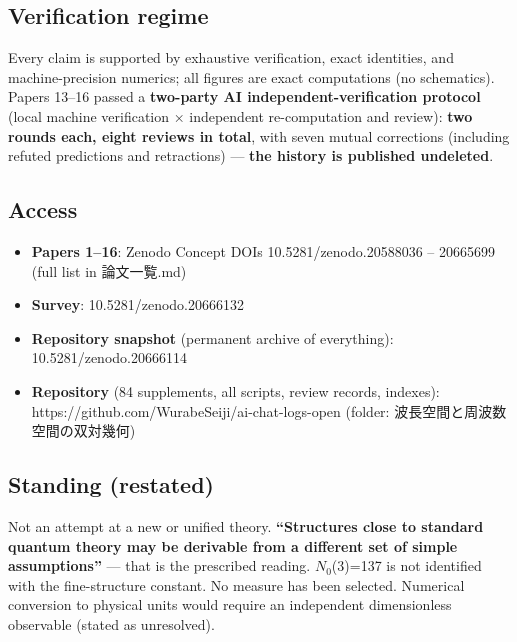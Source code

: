 \documentclass[
  10pt,
]{article}
\providecommand{\tightlist}{%
  \setlength{\itemsep}{0pt}\setlength{\parskip}{0pt}}
\begin{document}
\subsection{Verification regime}\label{verification-regime}

Every claim is supported by exhaustive verification, exact identities,
and machine-precision numerics; all figures are exact computations (no
schematics). Papers 13--16 passed a \textbf{two-party AI
independent-verification protocol} (local machine verification ×
independent re-computation and review): \textbf{two rounds each, eight
reviews in total}, with seven mutual corrections (including refuted
predictions and retractions) --- \textbf{the history is published
undeleted}.

\subsection{Access}\label{access}

\begin{itemize}
\tightlist
\item
  \textbf{Papers 1--16}: Zenodo Concept DOIs 10.5281/zenodo.20588036 --
  20665699 (full list in 論文一覧.md)
\item
  \textbf{Survey}: 10.5281/zenodo.20666132
\item
  \textbf{Repository snapshot} (permanent archive of everything):
  10.5281/zenodo.20666114
\item
  \textbf{Repository} (84 supplements, all scripts, review records,
  indexes): https://github.com/WurabeSeiji/ai-chat-logs-open (folder:
  波長空間と周波数空間の双対幾何)
\end{itemize}

\subsection{Standing (restated)}\label{standing-restated}

Not an attempt at a new or unified theory. \textbf{``Structures close to
standard quantum theory may be derivable from a different set of simple
assumptions''} --- that is the prescribed reading. \(N_0\)(3)=137 is not
identified with the fine-structure constant. No measure has been
selected. Numerical conversion to physical units would require an
independent dimensionless observable (stated as unresolved).
\end{document}
